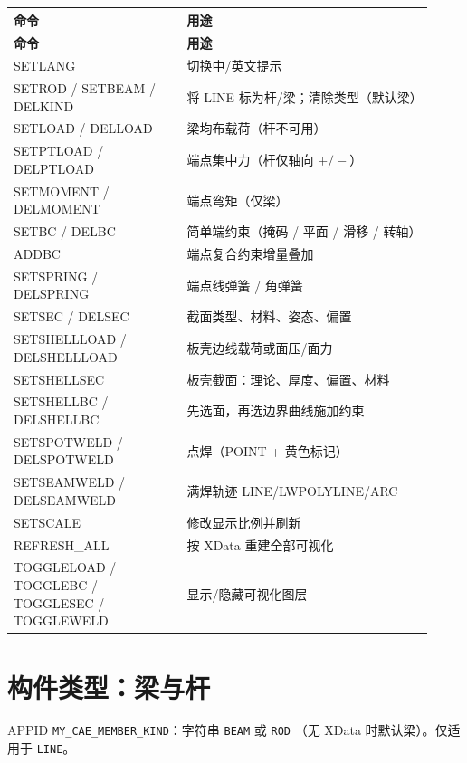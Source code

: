 \documentclass[a4paper]{ltxdoc}
\newcommand{\appid}[1]{\texttt{#1}}
\begin{document}
{\small
\begin{longtable}{@{}>{\ttfamily\raggedright\arraybackslash}p{0.38\linewidth}
                  >{\raggedright\arraybackslash}p{0.54\linewidth}@{}}
\toprule
\normalfont\textbf{命令} & \textbf{用途} \\
\midrule
\endfirsthead
\toprule
\normalfont\textbf{命令} & \textbf{用途} \\
\midrule
\endhead
\bottomrule
\endfoot
SETLANG & 切换中/英文提示 \\
SETROD / SETBEAM / DELKIND
  & 将 LINE 标为杆/梁；清除类型（默认梁） \\
SETLOAD / DELLOAD
  & 梁均布载荷（杆不可用） \\
SETPTLOAD / DELPTLOAD
  & 端点集中力（杆仅轴向 $+/-$） \\
SETMOMENT / DELMOMENT
  & 端点弯矩（仅梁） \\
SETBC / DELBC
  & 简单端约束（掩码 / 平面 / 滑移 / 转轴） \\
ADDBC & 端点复合约束增量叠加 \\
SETSPRING / DELSPRING
  & 端点线弹簧 / 角弹簧 \\
SETSEC / DELSEC
  & 截面类型、材料、姿态、偏置 \\
SETSHELLLOAD / DELSHELLLOAD
  & 板壳边线载荷或面压/面力 \\
SETSHELLSEC & 板壳截面：理论、厚度、偏置、材料 \\
SETSHELLBC / DELSHELLBC
  & 先选面，再选边界曲线施加约束 \\
SETSPOTWELD / DELSPOTWELD
  & 点焊（POINT + 黄色标记） \\
SETSEAMWELD / DELSEAMWELD
  & 满焊轨迹 LINE/LWPOLYLINE/ARC \\
SETSCALE & 修改显示比例并刷新 \\
REFRESH\_ALL & 按 XData 重建全部可视化 \\
TOGGLELOAD / TOGGLEBC / TOGGLESEC / TOGGLEWELD
  & 显示/隐藏可视化图层 \\
\end{longtable}}

\section{构件类型：梁与杆}

APPID \appid{MY\_CAE\_MEMBER\_KIND}：字符串 \texttt{BEAM} 或 \texttt{ROD}
（无 XData 时默认梁）。仅适用于 \texttt{LINE}。
\end{document}
